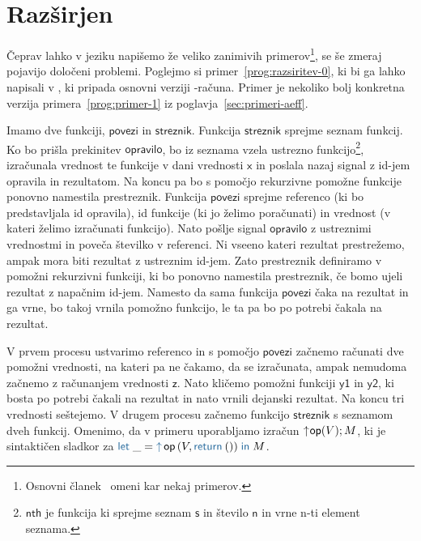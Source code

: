 \section{Razširjen \lae{}}\label{sec:razsirjen-lae}

Čeprav lahko v jeziku \aeff{} napišemo že veliko zanimivih primerov\footnote{Osnovni članek~\cite{aeff} omeni kar nekaj primerov.}, se še zmeraj pojavijo določeni problemi.
Poglejmo si primer~\ref{prog:razsiritev-0}, ki bi ga lahko napisali v \aeff{}, ki pripada osnovni verziji \lae{}\nobreakdash-računa. Primer je nekoliko bolj konkretna verzija primera~\ref{prog:primer-1} iz poglavja~\ref{sec:primeri-aeff}.

Imamo dve funkciji, $\mathsf{povezi}$ in $\mathsf{streznik}$.
Funkcija $\mathsf{streznik}$ sprejme seznam funkcij. Ko bo prišla prekinitev $\mathsf{opravilo}$, bo iz seznama vzela ustrezno funkcijo\footnote{$\mathsf{nth}$ je funkcija ki sprejme seznam $\mathsf{s}$ in število $\mathsf{n}$ in vrne n-ti element seznama.}, izračunala vrednost te funkcije v dani vrednosti $\mathsf{x}$ in poslala nazaj signal z id-jem opravila in rezultatom. Na koncu pa bo s pomočjo rekurzivne pomožne funkcije ponovno namestila prestreznik.
Funkcija $\mathsf{povezi}$ sprejme referenco (ki bo predstavljala id opravila), id funkcije (ki jo želimo poračunati) in vrednost (v kateri želimo izračunati funkcijo).
Nato pošlje signal $\mathsf{opravilo}$ z ustreznimi vrednostmi in poveča številko v referenci.
Ni vseeno kateri rezultat prestrežemo, ampak mora biti rezultat z ustreznim id-jem. Zato prestreznik definiramo v pomožni rekurzivni funkciji, ki bo ponovno namestila prestreznik, če bomo ujeli rezultat z napačnim id-jem.
Namesto da sama funkcija $\mathsf{povezi}$ čaka na rezultat in ga vrne, bo takoj vrnila pomožno funkcijo, le ta pa bo po potrebi čakala na rezultat.  

V prvem procesu ustvarimo referenco in s pomočjo $\mathsf{povezi}$ začnemo računati dve pomožni vrednosti, na kateri pa ne čakamo, da se izračunata, ampak nemudoma začnemo z računanjem vrednosti $\mathsf{z}$. Nato kličemo pomožni funkciji $\mathsf{y1}$ in $\mathsf{y2}$, ki bosta po potrebi čakali na rezultat in nato vrnili dejanski rezultat. Na koncu tri vrednosti seštejemo.
V drugem procesu začnemo funkcijo $\mathsf{streznik}$ s seznamom dveh funkcij.
Omenimo, da v primeru uporabljamo izračun $\uparrow\hspace{-0.5ex}\mathsf{op} (V);M$, ki je sintaktičen sladkor za $\tmlet{\_}{\tmopout{op}{V}{\tmreturn{()}}}{M}$.

